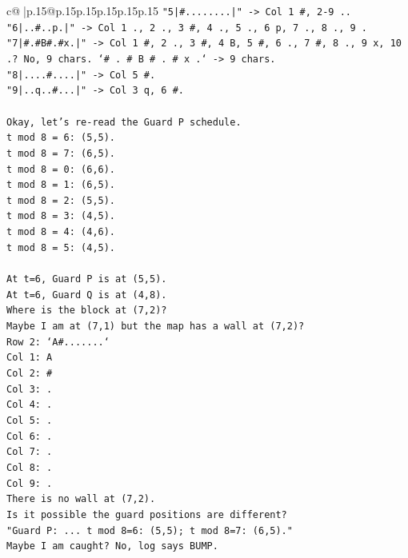 \documentclass{article}
\begin{document}
{\begin{supertabular}{c@{$\;$}|p{.15\linewidth}@{}p{.15\linewidth}p{.15\linewidth}p{.15\linewidth}p{.15\linewidth}p{.15\linewidth}}
{{{\texttt{"5|\#........|" {-}> Col 1 \#, 2{-}9 ..} \\
\texttt{"6|..\#..p.|" {-}> Col 1 ., 2 ., 3 \#, 4 ., 5 ., 6 p, 7 ., 8 ., 9 .} \\
\texttt{"7|\#.\#B\#.\#x.|" {-}> Col 1 \#, 2 ., 3 \#, 4 B, 5 \#, 6 ., 7 \#, 8 ., 9 x, 10 .? No, 9 chars. `\# . \# B \# . \# x .` {-}> 9 chars.} \\
\texttt{"8|....\#....|" {-}> Col 5 \#.} \\
\texttt{"9|..q..\#...|" {-}> Col 3 q, 6 \#.} \\
\\ 
\texttt{Okay, let's re{-}read the Guard P schedule.} \\
\texttt{t mod 8 = 6: (5,5).} \\
\texttt{t mod 8 = 7: (6,5).} \\
\texttt{t mod 8 = 0: (6,6).} \\
\texttt{t mod 8 = 1: (6,5).} \\
\texttt{t mod 8 = 2: (5,5).} \\
\texttt{t mod 8 = 3: (4,5).} \\
\texttt{t mod 8 = 4: (4,6).} \\
\texttt{t mod 8 = 5: (4,5).} \\
\\ 
\texttt{At t=6, Guard P is at (5,5).} \\
\texttt{At t=6, Guard Q is at (4,8).} \\
\texttt{Where is the block at (7,2)?} \\
\texttt{Maybe I am at (7,1) but the map has a wall at (7,2)?} \\
\texttt{Row 2: `A\#.......`} \\
\texttt{Col 1: A} \\
\texttt{Col 2: \#} \\
\texttt{Col 3: .} \\
\texttt{Col 4: .} \\
\texttt{Col 5: .} \\
\texttt{Col 6: .} \\
\texttt{Col 7: .} \\
\texttt{Col 8: .} \\
\texttt{Col 9: .} \\
\texttt{There is no wall at (7,2).} \\
\texttt{Is it possible the guard positions are different?} \\
\texttt{"Guard P: ... t mod 8=6: (5,5); t mod 8=7: (6,5)."} \\
\texttt{Maybe I am caught? No, log says BUMP.} \\
}}}
\end{supertabular}}
\end{document}
